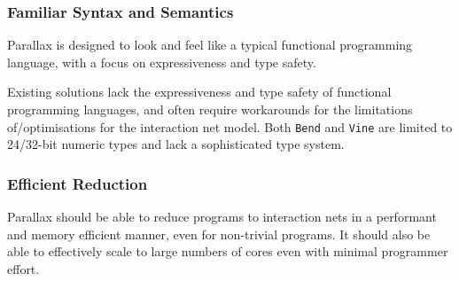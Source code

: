 \subsubsection{Familiar Syntax and Semantics}

Parallax is designed to look and feel like a typical functional programming language, with a focus on expressiveness and type safety.

Existing solutions lack the expressiveness and type safety of functional programming languages, and often require workarounds for the limitations of/optimisations for the interaction net model. Both \texttt{Bend} and \texttt{Vine} are limited to 24/32-bit numeric types and lack a sophisticated type system.

\subsubsection{Efficient Reduction}

Parallax should be able to reduce programs to interaction nets in a performant and memory efficient manner, even for non-trivial programs. It should also be able to effectively scale to large numbers of cores even with minimal programmer effort.


        
        
        
